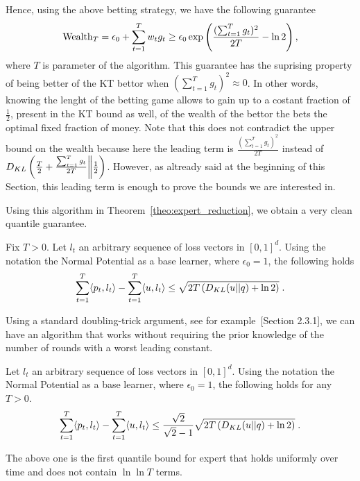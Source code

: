 Hence, using the above betting strategy, we have the following guarantee
\[
\operatorname{Wealth}_T = \epsilon_0 + \sum_{t=1}^T w_t g_t \geq \epsilon_0 \exp\left( \frac{(\sum_{t=1}^T g_t)^2}{2 T} - \ln 2\right),
\]
where $T$ is parameter of the algorithm. This guarantee has the suprising property of being better of the \ac{KT} bettor when $(\sum_{t=1}^T g_t)^2\approx0$. In other words, knowing the lenght of the betting game allows to gain up to a costant fraction of $\frac{1}{2}$, present in the \ac{KT} bound as well, of the wealth of the bettor the bets the optimal fixed fraction of money. Note that this does not contradict the upper bound on the wealth because here the leading term is $\frac{(\sum_{t=1}^T g_t)^2}{2 T}$ instead of $D_{KL}\left(\frac{T}{2}+\frac{\sum_{t=1}^T g_t}{2T}\middle\|\frac{1}{2}\right)$. However, as altready said at the beginning of this Section, this leading term is enough to prove the bounds we are interested in.

Using this algorithm in Theorem~\ref{theo:expert_reduction}, we obtain a very clean quantile guarantee.
\begin{cor}
\label{cor:kt_expert}
Fix $T>0$. Let $l_t$ an arbitrary sequence of loss vectors in $[0,1]^d$. Using the notation the Normal Potential as a base learner, where $\epsilon_0=1$, the following holds
\[
\sum_{t=1}^T \langle p_t, l_t\rangle -\sum_{t=1}^T \langle u , l_t\rangle 
\leq \sqrt{2 T \left(D_{KL}(u||q) +\ln 2 \right)} \; .
\]
\end{cor}

Using a standard doubling-trick argument, see for example~\citet{Shalev-Shwartz12}[Section 2.3.1], we can have an algorithm that works without requiring the prior knowledge of the number of rounds with a worst leading constant.

\begin{cor}
\label{cor:kt_expert_no_t}
Let $l_t$ an arbitrary sequence of loss vectors in $[0,1]^d$. Using the notation the Normal Potential as a base learner, where $\epsilon_0=1$, the following holds for any $T>0$.
\[
\sum_{t=1}^T \langle p_t, l_t\rangle -\sum_{t=1}^T \langle u , l_t\rangle 
\leq \frac{\sqrt{2}}{\sqrt{2}-1}\sqrt{2 T \left(D_{KL}(u||q) +\ln 2 \right)} \; .
\]
\end{cor}

The above one is the first quantile bound for expert that holds uniformly over time and does not contain $\ln \ln T$ terms.